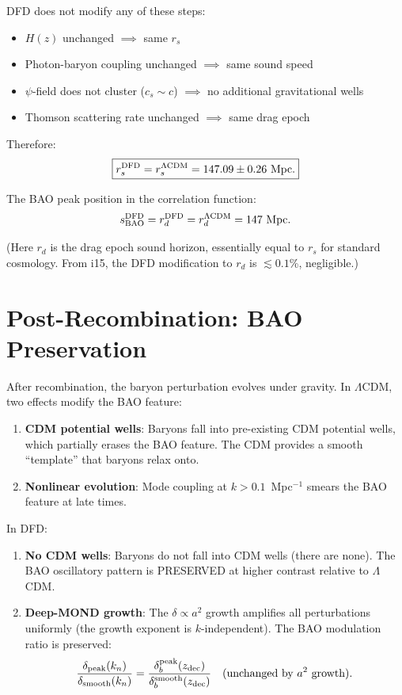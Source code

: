 \documentclass[11pt]{article}
\newcommand{\LCDM}{$\Lambda$CDM}
\begin{document}
DFD does not modify any of these steps:
\begin{itemize}
\item $H(z)$ unchanged $\implies$ same $r_s$
\item Photon-baryon coupling unchanged $\implies$ same sound speed
\item $\psi$-field does not cluster ($c_s \sim c$) $\implies$ no
  additional gravitational wells
\item Thomson scattering rate unchanged $\implies$ same drag epoch
\end{itemize}

Therefore:
\begin{equation}
\boxed{r_s^{\rm DFD} = r_s^{\Lambda\rm CDM} = 147.09 \pm 0.26\text{ Mpc.}}
\end{equation}

The BAO peak position in the correlation function:
\begin{equation}
s_{\rm BAO}^{\rm DFD} = r_d^{\rm DFD} = r_d^{\Lambda\rm CDM}
= 147\text{ Mpc}.
\end{equation}

(Here $r_d$ is the drag epoch sound horizon, essentially equal to
$r_s$ for standard cosmology. From i15, the DFD modification to
$r_d$ is $\lesssim 0.1$\%, negligible.)

\section{Post-Recombination: BAO Preservation}

After recombination, the baryon perturbation evolves under gravity.
In \LCDM, two effects modify the BAO feature:

\begin{enumerate}
\item \textbf{CDM potential wells}: Baryons fall into pre-existing
  CDM potential wells, which partially erases the BAO feature. The
  CDM provides a smooth ``template'' that baryons relax onto.

\item \textbf{Nonlinear evolution}: Mode coupling at $k > 0.1$~Mpc$^{-1}$
  smears the BAO feature at late times.
\end{enumerate}

In DFD:
\begin{enumerate}
\item \textbf{No CDM wells}: Baryons do not fall into CDM wells
  (there are none). The BAO oscillatory pattern is PRESERVED at
  higher contrast relative to \LCDM.

\item \textbf{Deep-MOND growth}: The $\delta \propto a^2$ growth
  amplifies all perturbations uniformly (the growth exponent is
  $k$-independent). The BAO modulation ratio is preserved:
  \begin{equation}
  \frac{\delta_{\rm peak}(k_n)}{\delta_{\rm smooth}(k_n)}
  = \frac{\delta_b^{\rm peak}(z_{\rm dec})}{\delta_b^{\rm smooth}(z_{\rm dec})}
  \quad\text{(unchanged by $a^2$ growth)}.
  \end{equation}
\end{enumerate}
\end{document}
